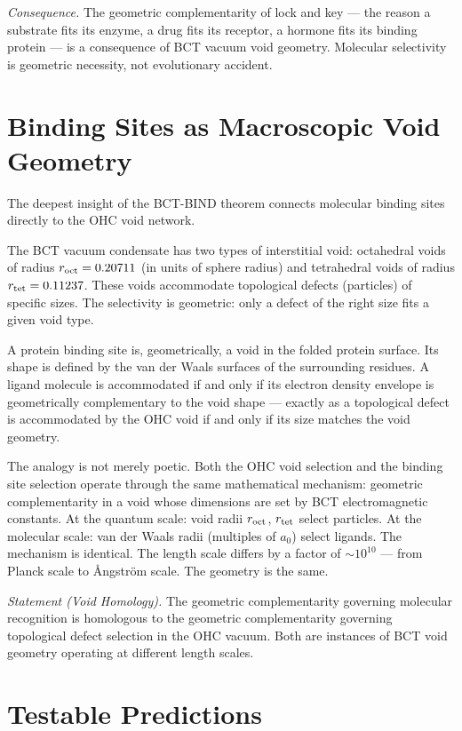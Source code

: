 \documentclass[aps,prl,preprint,superscriptaddress,floatfix]{revtex4-2}
\begin{document}
\textit{Consequence.} The geometric complementarity of lock and key ---
the reason a substrate fits its enzyme, a drug fits its receptor, a
hormone fits its binding protein --- is a consequence of BCT vacuum void
geometry. Molecular selectivity is geometric necessity, not evolutionary
accident.

\section{Binding Sites as Macroscopic Void Geometry}

The deepest insight of the BCT-BIND theorem connects molecular binding
sites directly to the OHC void network.

The BCT vacuum condensate has two types of interstitial void:
octahedral voids of radius $r_{\rm oct} = 0.20711$ (in units of sphere
radius) and tetrahedral voids of radius $r_{\rm tet} = 0.11237$.
These voids accommodate topological defects (particles) of specific sizes.
The selectivity is geometric: only a defect of the right size fits a
given void type.

A protein binding site is, geometrically, a void in the folded protein
surface. Its shape is defined by the van der Waals surfaces of the
surrounding residues. A ligand molecule is accommodated if and only if
its electron density envelope is geometrically complementary to the
void shape --- exactly as a topological defect is accommodated by the
OHC void if and only if its size matches the void geometry.

The analogy is not merely poetic. Both the OHC void selection and the
binding site selection operate through the same mathematical mechanism:
geometric complementarity in a void whose dimensions are set by BCT
electromagnetic constants. At the quantum scale: void radii $r_{\rm oct}$,
$r_{\rm tet}$ select particles. At the molecular scale: van der Waals
radii (multiples of $a_0$) select ligands. The mechanism is identical.
The length scale differs by a factor of $\sim 10^{10}$ --- from Planck
scale to \AA ngstr\"om scale. The geometry is the same.

\textit{Statement (Void Homology).} The geometric complementarity
governing molecular recognition is homologous to the geometric
complementarity governing topological defect selection in the OHC vacuum.
Both are instances of BCT void geometry operating at different length
scales.

\section{Testable Predictions}
\end{document}
